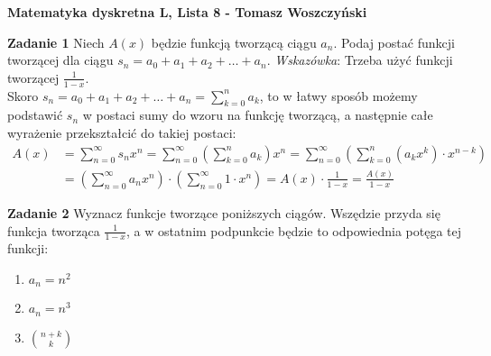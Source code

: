 \documentclass[a4paper,12pt]{article}
\begin{document}
\noindent \textbf{Matematyka dyskretna L, Lista 8 - Tomasz Woszczyński}\newline

\noindent \newline \textbf{Zadanie 1} \newline
Niech $A(x)$ będzie funkcją tworzącą ciągu $a_n$. Podaj postać funkcji tworzącej
dla ciągu $s_n = a_0 + a_1 + a_2 + \ldots + a_n$. \textit{Wskazówka}: Trzeba 
użyć funkcji tworzącej $\frac{1}{1-x}$. \\

\noindent Skoro $s_n = a_0 + a_1 + a_2 + \ldots + a_n = \sum\limits_{k=0}^n a_k$, 
to w łatwy sposób możemy podstawić $s_n$ w postaci sumy do wzoru na funkcję tworzącą, 
a następnie całe wyrażenie przekształcić do takiej postaci:
\begin{align*}
    A(x) &= \sum\limits_{n=0}^{\infty} s_n x^n = \sum\limits_{n = 0}^{\infty} 
    \left(\sum\limits_{k=0}^n a_k \right) x^n = \sum\limits_{n=0}^{\infty} 
    \left(\sum\limits_{k=0}^{n} \left( a_k x^k \right) \cdot x^{n-k} \right)  \\
    &= \left(\sum\limits_{n=0}^{\infty} a_n x^n \right) \cdot 
    \left(\sum\limits_{n=0}^{\infty} 1 \cdot x^n \right) = A(x) 
    \cdot \frac{1}{1 - x} = \frac{A(x)}{1 - x}
\end{align*}

\noindent \newline \textbf{Zadanie 2} \newline
Wyznacz funkcje tworzące poniższych ciągów. Wszędzie przyda się funkcja tworząca
$\frac{1}{1-x}$, a w ostatnim podpunkcie będzie to odpowiednia potęga tej funkcji:
\begin{enumerate}
    \item $a_n = n^2$
    \item $a_n = n^3$
    \item $\binom{n+k}{k}$
\end{enumerate}
\end{document}

